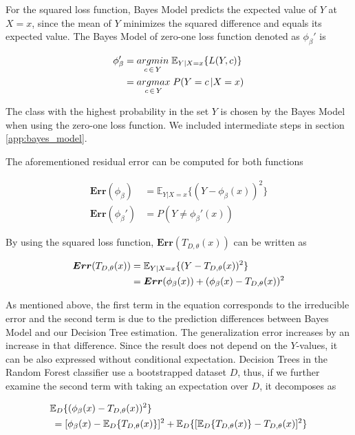 For the squared loss function, Bayes Model predicts the expected value of $Y$ at $X=x$,
since the mean of $Y$ minimizes the squared difference 
and equals its expected value.
The Bayes Model of zero-one loss function denoted as $\phi_{\beta}'$ is

\begin{align}\label{eq:bayes_model}
\phi_{\beta}' & = \underset{c \,\in\, Y}{argmin} \; \mathbb{E}_{Y|X=x}\{L(Y,c) \} \notag\\
			 & = \underset{c \,\in\, Y}{argmax} \; P(Y = c \,| X = x)
\end{align}

The class with the highest probability in the set $Y$ is chosen by the Bayes Model when using the zero-one loss function.
We included intermediate steps in section \ref{app:bayes_model}. 

The aforementioned residual error can be computed for both functions

\begin{align}
\boldsymbol{Err}(\phi_{\beta}) & = \mathbb{E}_{Y|X=x}\{(Y-\phi_{\beta}(x))^2 \}\\
\boldsymbol{Err}(\phi_{\beta}') & = P(Y \neq \phi_{\beta}'(x) )
\end{align}

By using the squared loss function, $\boldsymbol{Err}(T_{D,\theta}(x))$ can be written as

\begin{align}\label{eq:decomp_squared_loss}
\boldsymbol{Err}(T_{D, \theta}(x)) & = \mathbb{E}_{Y|X=x}\{(Y-T_{D,\theta}(x))^2\} \notag \\
							   	  & = \boldsymbol{Err}(\phi_{\beta}(x)) + (\phi_{\beta}(x)-T_{D,\theta}(x))^2
\end{align}

As mentioned above, the first term in the equation corresponds to the 
irreducible error and the second term is due to the prediction differences between Bayes Model and our Decision Tree estimation. 
The generalization error increases by an increase in that difference. Since the result does not depend on the $Y$-values, 
it can be also expressed without conditional expectation. 
Decision Trees in the Random Forest classifier use a bootstrapped dataset $D$, thus, 
if we further examine the second term with taking an expectation over $D$, 
it decomposes as

\begin{align}\label{eq:decomp_squared_loss_cont}
	& \mathbb{E}_{D}\{(\phi_{\beta}(x) - T_{D,\theta}(x))^2 \} \notag \\
	& \: = [\phi_{\beta}(x) - \mathbb{E}_{D}\{T_{D,\theta}(x)\}]^2 + 
	\mathbb{E}_{D}\{[\mathbb{E}_{D}\{T_{D,\theta}(x)\} - T_{D,\theta}(x)]^2\}
\end{align}

